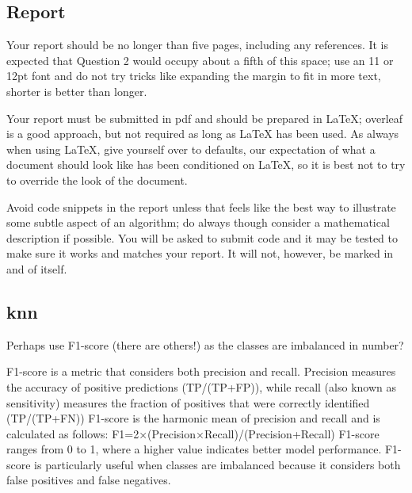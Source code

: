 \documentclass[12pt]{article}
\begin{document}
\subsection*{Report}

Your report should be no longer than five pages, including any
references. It is expected that Question 2 would occupy about a fifth
of this space; use an 11 or 12pt font and do not try tricks like
expanding the margin to fit in more text, shorter is better than
longer.

Your report must be submitted in pdf and should be prepared in LaTeX;
overleaf is a good approach, but not required as long as LaTeX has
been used. As always when using LaTeX, give yourself over to defaults,
our expectation of what a document should look like has been
conditioned on LaTeX, so it is best not to try to override the look of
the document.

Avoid code snippets in the report unless that feels like the best way
to illustrate some subtle aspect of an algorithm; do always though
consider a mathematical description if possible. You will be asked to
submit code and it may be tested to make sure it works and matches
your report. It will not, however, be marked in and of itself.

\subsection*{knn}

Perhaps use F1-score (there are others!) as the classes are imbalanced in number?

F1-score is a metric that considers both precision and recall. Precision measures the accuracy of positive predictions (TP/(TP+FP)), while recall (also known as sensitivity) measures the fraction of positives that were correctly identified (TP/(TP+FN))
F1-score is the harmonic mean of precision and recall and is calculated as follows:
F1=2×(Precision×Recall)/(Precision+Recall​)
F1-score ranges from 0 to 1, where a higher value indicates better model performance. F1-score is particularly useful when classes are imbalanced because it considers both false positives and false negatives.
\end{document}
